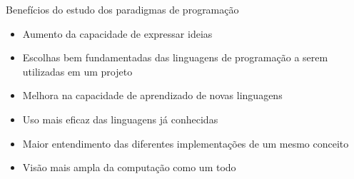 \begin{frame}[fragile]{Benefícios do estudo dos paradigmas de programação}

    \begin{itemize}
        \item Aumento da capacidade de expressar ideias
        \item Escolhas bem fundamentadas das linguagens de programação a serem utilizadas em um 
            projeto
        \item Melhora na capacidade de aprendizado de novas linguagens
        \item Uso mais eficaz das linguagens já conhecidas
        \item Maior entendimento das diferentes implementações de um mesmo conceito
        \item Visão mais ampla da computação como um todo
    \end{itemize}

\end{frame}
